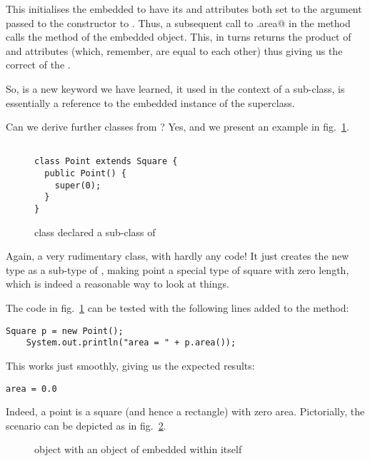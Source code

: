 \documentclass[12pt,a4paper]{article}
\begin{document}
This initialises the embedded \lstinline@Rectangle@ to have its \lstinline@length@ and \lstinline@breadth@ attributes both set to the argument passed to the constructor to \lstinline@Square@. Thus, a subsequent call to \lstinline@s.area@ in the \lstinline@main@ method calls the \lstinline@area@ method of the embedded \lstinline@Rectangle@ object. This, in turns returns the product of \lstinline@length@ and \lstinline@breadth@ attributes (which, remember, are equal to each other) thus giving us the correct \lstinline@area@ of the \lstinline@Square@.

So, \lstinline@super@ is a new keyword we have learned, it used in the context of a sub-class, is essentially a reference to the embedded instance of the superclass.  

Can we derive further classes from \lstinline@Square@? Yes, and we present an example in fig.~\ref{f:pt}.
\begin{figure}[H]
\begin{lstlisting}[frame=single]

class Point extends Square {
  public Point() {
    super(0);
  }
}
\end{lstlisting}
\caption{\lstinline@Square@ class declared a sub-class of \lstinline@Rectangle@}
\label{f:pt}
\end{figure}

Again, a very rudimentary class, with hardly any code! It just creates the new type \lstinline@Point@ as a sub-type of \lstinline@Square@, making point a special type of square with zero length, which is indeed a reasonable way to look at things.

The code in fig.~\ref{f:pt} can be tested with the following lines added to the \lstinline@main@ method:
\begin{lstlisting}[frame=single]
    Square p = new Point();
    System.out.println("area = " + p.area());
\end{lstlisting}

This works just smoothly, giving us the expected results:
\begin{lstlisting}[frame=single]
area = 0.0
\end{lstlisting}

Indeed, a point is a square (and hence a rectangle) with zero area. Pictorially, the scenario can be depicted as in fig.~\ref{f:sup2}.
\begin{figure}[H]
\begin{center}

\end{center}
\caption{\lstinline@Point@ object with an object of \lstinline@Square@ embedded within itself}
\label{f:sup2}
\end{figure}
\end{document}
